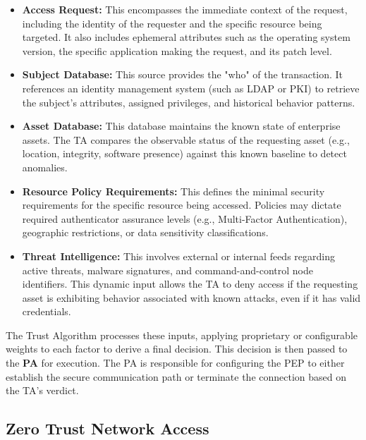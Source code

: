 \documentclass[12pt, a4paper, reqno, oneside]{book}
\begin{document}
\begin{itemize}
    \item \textbf{Access Request:} This encompasses the immediate context of the request, including the identity of the requester and the specific resource being targeted. It also includes ephemeral attributes such as the operating system version, the specific application making the request, and its patch level.
    
    \item \textbf{Subject Database:} This source provides the "who" of the transaction. It references an identity management system (such as LDAP or PKI) to retrieve the subject's attributes, assigned privileges, and historical behavior patterns.
    
    \item \textbf{Asset Database:} This database maintains the known state of enterprise assets. The TA compares the observable status of the requesting asset (e.g., location, integrity, software presence) against this known baseline to detect anomalies.
    
    \item \textbf{Resource Policy Requirements:} This defines the minimal security requirements for the specific resource being accessed. Policies may dictate required authenticator assurance levels (e.g., Multi-Factor Authentication), geographic restrictions, or data sensitivity classifications.
    
    \item \textbf{Threat Intelligence:} This involves external or internal feeds regarding active threats, malware signatures, and command-and-control node identifiers. This dynamic input allows the TA to deny access if the requesting asset is exhibiting behavior associated with known attacks, even if it has valid credentials.
\end{itemize}

The Trust Algorithm processes these inputs, applying proprietary or configurable weights to each factor to derive a final decision. This decision is then passed to the \textbf{PA} for execution. The PA is responsible for configuring the PEP to either establish the secure communication path or terminate the connection based on the TA's verdict.


\subsection{Zero Trust Network Access}
\label{sec:ztna}
\end{document}
